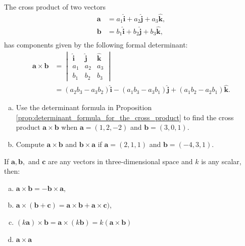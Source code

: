 \documentclass[12pt,letterpaper,reqno]{article}
\numberwithin{equation}{section}
\begin{document}
\begin{prop}\label{prop:determinant_formula_for_the_cross_product}
	The cross product of two vectors 
	\begin{align*}
	\mathbf{a}&=a_1\mathbf{\hat{i}}+a_2\mathbf{\hat{j}}+a_3\mathbf{\hat{k}}, \\
	\mathbf{b}&=b_1\mathbf{\hat{i}}+b_2\mathbf{\hat{j}}+b_3\mathbf{\hat{k}}, \\
\end{align*}
has components given by the following formal determinant: 
\begin{align*}
	\mathbf{a} \times \mathbf{b}&=\begin{vmatrix}
		\mathbf{\hat{i}} & \mathbf{\hat{j}} & \mathbf{\hat{k}} \\
		a_1 & a_2 & a_3 \\
		b_1 & b_2 & b_3 
	\end{vmatrix} \\
	&=(a_2b_3-a_3b_2)\mathbf{\hat{i}}-(a_1b_3-a_3b_1)\mathbf{\hat{j}}+(a_1b_2-a_2b_1)\mathbf{\hat{k}}.
\end{align*}
\end{prop}

\begin{exercise}
\begin{enumerate}[(a)]
	\item Use the determinant formula in Proposition \ref{prop:determinant_formula_for_the_cross_product} to find the cross product $\mathbf{a} \times \mathbf{b}$ when $\mathbf{a}=(1,2,-2)$ and $\mathbf{b}=(3,0,1)$.
	\item Compute $\mathbf{a} \times \mathbf{b}$ and $\mathbf{b} \times \mathbf{a}$ if $\mathbf{a}=(2,1,1)$ and $\mathbf{b}=(-4,3,1)$.
\end{enumerate}	
\end{exercise}

\begin{thm}\label{thm:props_cp}
	If $\mathbf{a},\mathbf{b},$ and $\mathbf{c}$ are any vectors in three-dimensional space and $k$ is any scalar, then:
	\begin{enumerate}[(a)]
		\item $\mathbf{a} \times \mathbf{b}=-\mathbf{b} \times \mathbf{a}$,
		\item $\mathbf{a} \times (\mathbf{b}+\mathbf{c})=\mathbf{a} \times \mathbf{b}+\mathbf{a} \times \mathbf{c})$,
		\item $(k\mathbf{a}) \times \mathbf{b}=\mathbf{a} \times (k\mathbf{b})=k(\mathbf{a} \times \mathbf{b})$
		\item $\mathbf{a} \times \mathbf{a}$
	\end{enumerate}
\end{thm}
\end{document}
